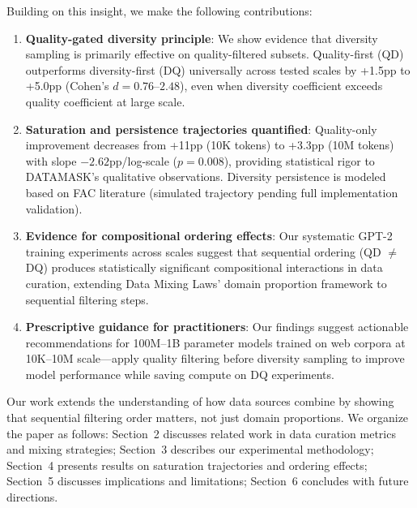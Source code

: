 Building on this insight, we make the following contributions:

\begin{enumerate}
\item \textbf{Quality-gated diversity principle}: We show evidence that diversity sampling is primarily effective on quality-filtered subsets. Quality-first (QD) outperforms diversity-first (DQ) universally across tested scales by +1.5pp to +5.0pp (Cohen's $d=0.76$--$2.48$), even when diversity coefficient exceeds quality coefficient at large scale.

\item \textbf{Saturation and persistence trajectories quantified}: Quality-only improvement decreases from +11pp (10K tokens) to +3.3pp (10M tokens) with slope $-2.62$pp/log-scale ($p=0.008$), providing statistical rigor to DATAMASK's qualitative observations. Diversity persistence is modeled based on FAC literature (simulated trajectory pending full implementation validation).

\item \textbf{Evidence for compositional ordering effects}: Our systematic GPT-2 training experiments across scales suggest that sequential ordering (QD $\neq$ DQ) produces statistically significant compositional interactions in data curation, extending Data Mixing Laws' domain proportion framework to sequential filtering steps.

\item \textbf{Prescriptive guidance for practitioners}: Our findings suggest actionable recommendations for 100M--1B parameter models trained on web corpora at 10K--10M scale---apply quality filtering before diversity sampling to improve model performance while saving compute on DQ experiments.
\end{enumerate}

Our work extends the understanding of how data sources combine by showing that sequential filtering order matters, not just domain proportions. We organize the paper as follows: Section~2 discusses related work in data curation metrics and mixing strategies; Section~3 describes our experimental methodology; Section~4 presents results on saturation trajectories and ordering effects; Section~5 discusses implications and limitations; Section~6 concludes with future directions.
